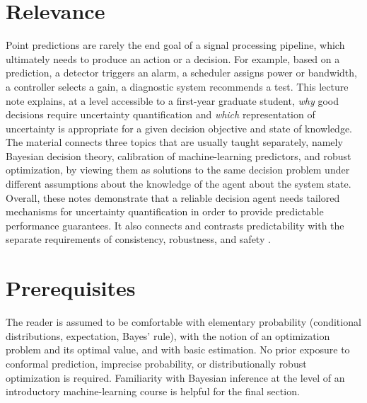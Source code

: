 \documentclass[journal]{IEEEtran}
\theoremstyle{definition}
\theoremstyle{remark}
\begin{document}
\section{Relevance}
Point predictions are rarely the end goal of a signal processing pipeline, which ultimately needs to produce an action or a decision. For example, based on a prediction, a detector triggers an alarm, a scheduler
assigns power or bandwidth, a controller selects a gain, a diagnostic system
recommends a test. This lecture note explains, at a level accessible to a
first-year graduate student, \emph{why} good decisions require uncertainty
quantification and \emph{which} representation of uncertainty is appropriate
for a given decision objective and state of knowledge. {The material connects three topics 
that are usually taught separately, namely Bayesian decision theory, calibration
of machine-learning predictors, and  robust
optimization, by viewing them as solutions to the same decision problem under different assumptions about the knowledge of the agent about the system state. {Overall, these notes demonstrate that a reliable decision agent needs tailored mechanisms for uncertainty quantification in order to provide predictable performance guarantees. It also connects and contrasts predictability with the separate requirements of consistency, robustness, and safety \cite{rabanser2026towards}.} }

\section{Prerequisites}
The reader is assumed to be comfortable with elementary probability
(conditional distributions, expectation, Bayes' rule), with the notion of an
optimization problem and its optimal value, and with basic estimation. No
prior exposure to conformal prediction, imprecise probability, or
distributionally robust optimization is required.  Familiarity with Bayesian inference at the
level of an introductory machine-learning course \cite{simeone2022ml} is
helpful for the final section.

\end{document}
